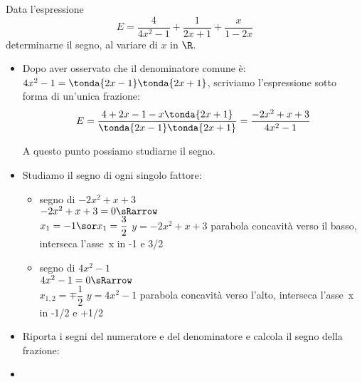 \begin{esempio}
Data l'espressione 
\[E=\dfrac{4}{4x^2-1}+\dfrac {1}{2x+1}+\dfrac{x}{1-2x}\]
determinarne il segno, al variare di \(x\) in \(\R\).


\begin{itemize}

\item Dopo aver osservato che il denominatore comune è:
\(4x^2-1 =\tonda{2x-1}\tonda{2x+1}\), scriviamo 
l'espressione sotto forma di un'unica frazione:
\[E=\dfrac{4+2x-1 - x \tonda{2x+1}}{\tonda{2x-1}\tonda{2x+1}} =
\dfrac{-2x^2+x+3}{4x^2-1}\]

A questo punto possiamo studiarne il segno.

 \item Studiamo il segno di ogni singolo fattore:

\begin{itemize}

 \item  segno di \(-2x^2+x+3\)\\
 \segnofatt
   {\(-2x^2+x+3=0 \sRarrow\)\\
  \(x_1=-1 \sor x_1=\dfrac{3}{2}\)}
   {\(y=-2x^2+x+3\)}
   {parabola concavità verso il basso, interseca l'asse~x in -1 e 3/2}
   {}
 \item segno di \(4x^2-1\)\\
 \segnofatt
   {\(4x^2-1=0 \sRarrow \) \\
  \(x_{1,2}=\mp\dfrac{1}{2}\)}
   {\(y=4x^2-1\)}
   {parabola concavità verso l'alto, interseca l'asse~x in -1/2 e +1/2}
   {}
\end{itemize}
 \item Riporta i segni del numeratore e del denominatore e calcola
il segno della frazione:

\begin{inaccessibleblock}
  \begin{center}
  \segnofrazioneb
  \end{center}
\end{inaccessibleblock}
\item 
\end{itemize}
\end{esempio}


